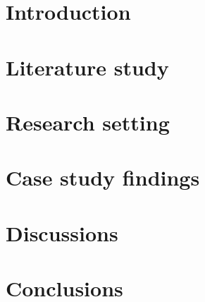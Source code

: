 \documentclass[english,12pt,a4paper,pdftex,sci,utf8]{aaltothesis}
\begin{document}


\section{Introduction} \label{introduction}

\clearpage

\section{Literature study} \label{literature}

\clearpage

\section{Research setting} \label{research setting}

\clearpage

\section{Case study findings} \label{case study}

\clearpage

\section{Discussions} \label{discussions}

\clearpage

\section{Conclusions} \label{conclusions}

\clearpage
\end{document}
